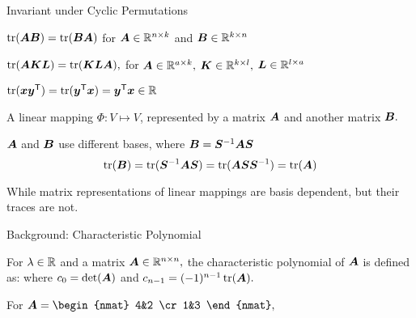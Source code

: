 \documentclass[handout,fleqn,aspectratio=169]{beamer}
\begin{document}
\begin{frame}{Invariant under Cyclic Permutations}

\plitemsep 0.1in

\bci
\item $\operatorname{tr}(\bm{A}\bm{B}) = \operatorname{tr}(\bm{B} \bm{A})$ for $\bm{A} \in {\mathbb R}^{n \times k}$ and $\bm{B} \in {\mathbb R}^{k \times n}$
\item $\operatorname{tr}(\bm{A} \bm{K} \bm{L}) = \operatorname{tr}(\bm{K} \bm{L} \bm{A}),$ for $\bm{A} \in {\mathbb R}^{a \times k},$ $\bm{K} \in {\mathbb R}^{k \times l},$ $\bm{L} \in {\mathbb R}^{l \times a}$
\item $\operatorname{tr}(\bm{x}{\bm{y}}^{\mathsf{T}}) = \operatorname{tr}({\bm{y}}^{\mathsf{T}} \bm{x}) = {\bm{y}}^{\mathsf{T}} \bm{x} \in {\mathbb R}$

\medskip
\item A linear mapping $\Phi: V \mapsto V$, represented by a matrix $\bm{A}$ and another matrix $\bm{B}.$ 
\bci
\item $\bm{A}$ and $\bm{B}$ use different bases, where $\bm{B} = {{\bm{S}}^{-1}} \bm{A} \bm{S}$ 
$$
\operatorname{tr}(\bm{B}) = \operatorname{tr}({{\bm{S}}^{-1}} \bm{A} \bm{S}) = \operatorname{tr}( \bm{A} \bm{S}{{\bm{S}}^{-1}}) = \operatorname{tr}(\bm{A})
$$
\item {} While matrix representations of linear mappings are basis dependent, but their traces are not. 
\eci
\eci
\end{frame}

\begin{frame}{Background: Characteristic Polynomial}

\plitemsep 0.1in

\bci
\item {} For $\lambda \in {\mathbb R}$ and a matrix $\bm{A} \in {\mathbb R}^{n \times n},$ the characteristic polynomial of $\bm{A}$ is defined as:
where $c_0 = \det(\bm{A})$ and $c_{n-1} = (-1)^{n-1}\operatorname{tr}(\bm{A}).$

\item \exam For $\mA = \begin{nmat}
4&2 \cr
1&3
\end{nmat},$ 
\eci
\end{frame}

\end{document}
